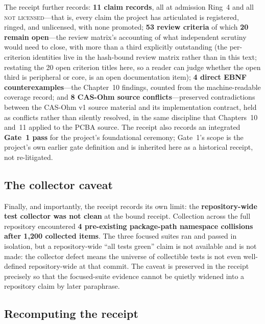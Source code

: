 The receipt further records: \textbf{11 claim records}, all at admission Ring~4 and all \textsc{not licensed}---that is, every claim the project has articulated is registered, ringed, and unlicensed, with none promoted; \textbf{53 review criteria} of which \textbf{20 remain open}---the review matrix's accounting of what independent scrutiny would need to close, with more than a third explicitly outstanding (the per-criterion identities live in the hash-bound review matrix rather than in this text; restating the 20 open criterion titles here, so a reader can judge whether the open third is peripheral or core, is an open documentation item); \textbf{4 direct EBNF counterexamples}---the Chapter~10 findings, counted from the machine-readable coverage record; and \textbf{8 CAS-Ohm source conflicts}---preserved contradictions between the CAS-Ohm v1 source material and its implementation contract, held as conflicts rather than silently resolved, in the same discipline that Chapters~10 and~11 applied to the PCBA source. The receipt also records an integrated \textbf{Gate~1 pass} for the project's foundational ceremony; Gate~1's scope is the project's own earlier gate definition and is inherited here as a historical receipt, not re-litigated.

\subsection{The collector caveat}

Finally, and importantly, the receipt records its own limit: the \textbf{repository-wide test collector was not clean} at the bound receipt. Collection across the full repository encountered \textbf{4 pre-existing package-path namespace collisions after 1{,}200 collected items}. The three focused suites ran and passed in isolation, but a repository-wide ``all tests green'' claim is not available and is not made: the collector defect means the universe of collectible tests is not even well-defined repository-wide at that commit. The caveat is preserved in the receipt precisely so that the focused-suite evidence cannot be quietly widened into a repository claim by later paraphrase.

\subsection{Recomputing the receipt}

